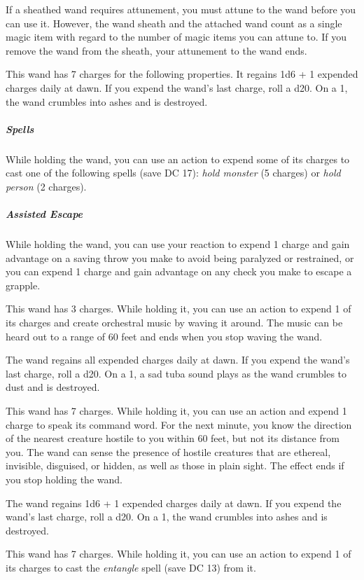 \documentclass[10pt,a4paper,twoside,bg=print,twocolumn,openany,nodeprecatedcode]{dndbook}
\begin{document}
If a sheathed wand requires attunement, you must attune to the wand before you can use it. However, the wand sheath and the attached wand count as a single magic item with regard to the number of magic items you can attune to. If you remove the wand from the sheath, your attunement to the wand ends.

This wand has 7 charges for the following properties. It regains 1d6 + 1 expended charges daily at dawn. If you expend the wand's last charge, roll a d20. On a 1, the wand crumbles into ashes and is destroyed.

\subparagraph{Spells}
While holding the wand, you can use an action to expend some of its charges to cast one of the following spells (save DC 17): \textit{hold monster} (5 charges) or \textit{hold person} (2 charges).

\subparagraph{Assisted Escape}
While holding the wand, you can use your reaction to expend 1 charge and gain advantage on a saving throw you make to avoid being paralyzed or restrained, or you can expend 1 charge and gain advantage on any check you make to escape a grapple.

This wand has 3 charges. While holding it, you can use an action to expend 1 of its charges and create orchestral music by waving it around. The music can be heard out to a range of 60 feet and ends when you stop waving the wand.

The wand regains all expended charges daily at dawn. If you expend the wand's last charge, roll a d20. On a 1, a sad tuba sound plays as the wand crumbles to dust and is destroyed.

This wand has 7 charges. While holding it, you can use an action and expend 1 charge to speak its command word. For the next minute, you know the direction of the nearest creature hostile to you within 60 feet, but not its distance from you. The wand can sense the presence of hostile creatures that are ethereal, invisible, disguised, or hidden, as well as those in plain sight. The effect ends if you stop holding the wand.

The wand regains 1d6 + 1 expended charges daily at dawn. If you expend the wand's last charge, roll a d20. On a 1, the wand crumbles into ashes and is destroyed.

This wand has 7 charges. While holding it, you can use an action to expend 1 of its charges to cast the \textit{entangle} spell (save DC 13) from it.
\end{document}
